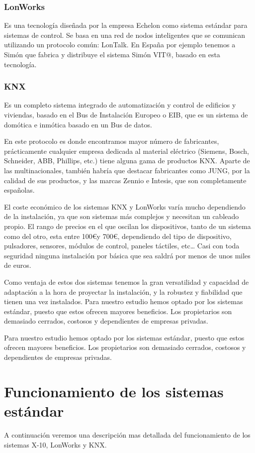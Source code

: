 \subsubsection{LonWorks}
Es una tecnología diseñada por la empresa Echelon como sistema est\'andar para sistemas de control. Se basa en una red de nodos inteligentes que se comunican utilizando un protocolo común: LonTalk. En España por ejemplo tenemos a Simón que fabrica y distribuye el sistema Simón VIT@, basado en esta tecnología.

\subsubsection{KNX}
Es un completo sistema integrado de automatización y control de edificios y viviendas, basado en el Bus de Instalación Europeo o EIB, que es un sistema de domótica e inmótica basado en un Bus de datos.


En este protocolo es donde encontramos mayor número de fabricantes, pr\'acticamente cualquier empresa dedicada al material eléctrico (Siemens, Bosch, Schneider, ABB, Phillips, etc.) tiene alguna gama de productos KNX. Aparte de las multinacionales, también habría que destacar fabricantes como JUNG, por la calidad de sus productos, y las marcas Zennio e Intesis, que son completamente españolas.


El coste económico de los sistemas KNX y LonWorks varía mucho dependiendo de la instalación, ya que son sistemas m\'as complejos y necesitan un cableado propio. El rango de precios en el que oscilan los dispositivos, tanto de un sistema como del otro, esta entre 100\euro y 700\euro, dependiendo del tipo de dispositivo, pulsadores, sensores, módulos de control, paneles t\'actiles, etc… Casi con toda seguridad ninguna instalación por b\'asica que sea saldr\'a por menos de unos miles de euros. 

Como ventaja de estos dos sistemas tenemos la gran versatilidad y capacidad de adaptación a la hora de proyectar la instalación, y la robustez y fiabilidad que tienen una vez instalados. Para nuestro estudio hemos optado por los sistemas estándar, puesto que estos ofrecen mayores beneficios. Los propietarios son demasiado cerrados, costosos y dependientes de empresas privadas.

Para nuestro estudio hemos optado por los sistemas estándar, puesto que estos ofrecen mayores beneficios. Los propietarios son demasiado cerrados, costosos y dependientes de empresas privadas.

\section{Funcionamiento de los sistemas estándar}
A continuación veremos una descripción mas detallada del funcionamiento de los sistemas X-10, LonWorks y KNX.
